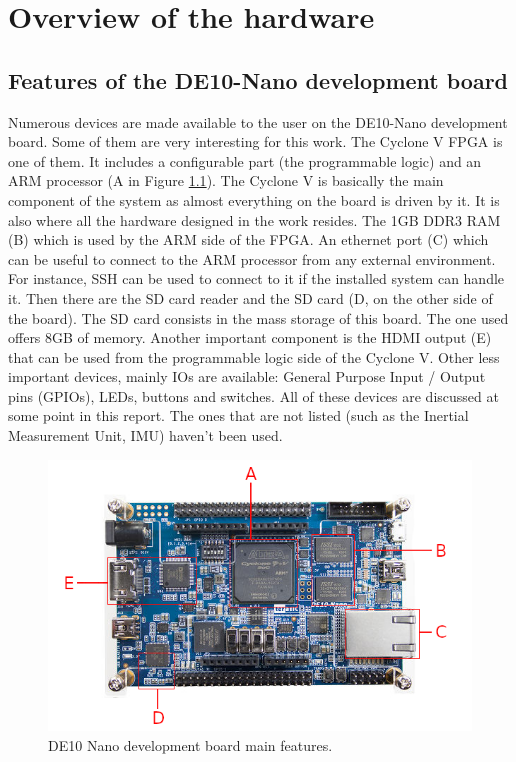 \chapter{Overview of the hardware}

\section{Features of the DE10-Nano development board}

Numerous devices are made available to the user on the DE10-Nano development board. Some of them are very 
interesting for this work. The Cyclone V FPGA is one of them. It includes a configurable part (the programmable 
logic) and an ARM processor (A in Figure \ref{fig:de10/de10_features}). The Cyclone V is
basically the main component of the system as almost everything on the board is driven by it. It is
also where all the hardware designed in the work resides. The 1GB DDR3 RAM (B) which is used 
by the ARM side of the FPGA. An ethernet port (C) which can be
useful to connect to the ARM processor from any external environment. For instance, SSH can be used
to connect to it if the installed system can handle it. Then there are the SD card reader and the SD 
card (D, on the other side of the board). The SD card consists in the mass storage of this board. The
one used offers 8GB of memory. Another important component is the HDMI output (E) that can be used
from the programmable logic side of the Cyclone V. Other less important devices, mainly IOs are 
available: General Purpose Input / Output pins (GPIOs), LEDs, buttons and switches. All of these 
devices are discussed at some point in this report. The ones that are not listed (such as the Inertial
Measurement Unit, IMU) haven't been used.

\begin{figure}[H]
    \centering
    \includegraphics[scale=0.5]{Chapter1-Hardware/res/de10_nano.png}
    \caption{DE10 Nano development board main features.}
    \label{fig:de10/de10_features}
\end{figure}

